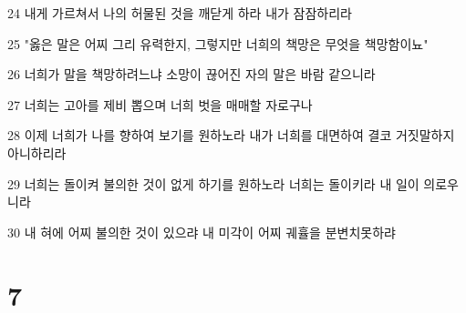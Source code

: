 \par 24 내게 가르쳐서 나의 허물된 것을 깨닫게 하라 내가 잠잠하리라
\par 25 "옳은 말은 어찌 그리 유력한지, 그렇지만 너희의 책망은 무엇을 책망함이뇨"
\par 26 너희가 말을 책망하려느냐 소망이 끊어진 자의 말은 바람 같으니라
\par 27 너희는 고아를 제비 뽑으며 너희 벗을 매매할 자로구나
\par 28 이제 너희가 나를 향하여 보기를 원하노라 내가 너희를 대면하여 결코 거짓말하지 아니하리라
\par 29 너희는 돌이켜 불의한 것이 없게 하기를 원하노라 너희는 돌이키라 내 일이 의로우니라
\par 30 내 혀에 어찌 불의한 것이 있으랴 내 미각이 어찌 궤휼을 분변치못하랴

\chapter{7}

